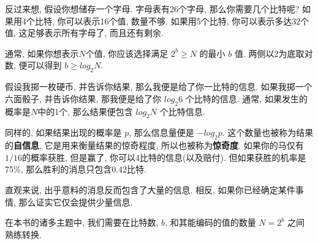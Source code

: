 \documentclass[12pt]{book}
\begin{document}
{反过来想, 假设你想储存一个字母. 字母表有26个字母, 
那么你需要几个比特呢? 如果用4个比特, 你可以表示16个值, 数量不够.
如果用5个比特, 你可以表示多达32个值, 这足够表示所有字母了, 而且还有剩余.

%

通常, 如果你想表示$N$个值, 你应该选择满足 $2^b \ge N$ 的最小 $b$ 值.
两侧以2为底取对数, 便可以得到 $b \ge log_2 N$.

假设我掷一枚硬币, 并告诉你结果, 那么我便是给了你一比特的信息.
如果我掷一个六面骰子, 并告诉你结果, 那我便是给了你 $log_2 6$ 个比特的信息.
通常, 如果发生的概率是$N$中的1个, 那么结果便包含 $log_2 N$ 个比特信息.

%
%
同样的, 如果结果出现的概率是 $p$, 那么信息量便是 $-log_2 p$.
这个数量也被称为结果的{\bf 自信息}, 它是用来衡量结果的惊奇程度, 
所以也被称为{\bf 惊奇度}. 如果你的马仅有$1/16$的概率获胜,
但是赢了, 你可以4比特的信息(以及赔付). 
但如果获胜的机率是75\%, 那么胜利的消息只包含0.42比特.

直观来说, 出乎意料的消息反而包含了大量的信息.
相反, 如果你已经确定某件事情, 那么证实它仅会提供少量信息.

在本书的诸多主题中, 我们需要在比特数, $b$, 和其能编码的值的数量 $N = 2^b$ 之间
熟练转换.

}
\end{document}
